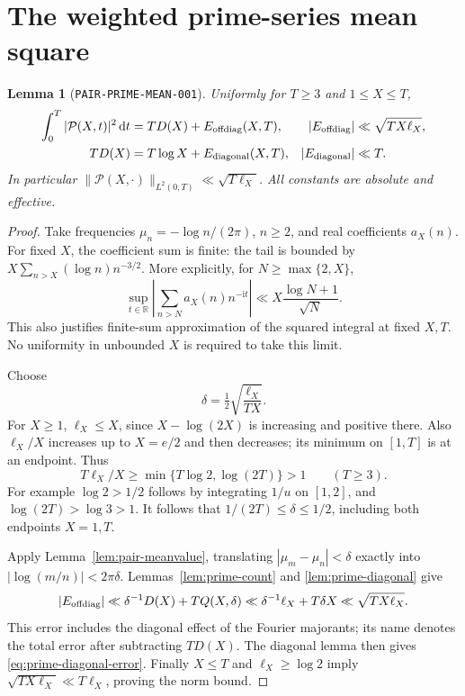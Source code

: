 \documentclass[11pt]{article}
\newtheorem{lemma}{Lemma}
\newcommand{\dd}{\,\mathrm d}
\newcommand{\ii}{\mathrm i}
\newcommand{\PS}{\mathcal P}
\begin{document}
\section{The weighted prime-series mean square}

\begin{lemma}[\texttt{PAIR-PRIME-MEAN-001}]\label{lem:prime-mean}
Uniformly for \(T\geq3\) and \(1\leq X\leq T\),
\begin{align}
 \int_0^T|\PS(X,t)|^2\dd t
 &=TD(X)+E_{\rm offdiag}(X,T),&
 |E_{\rm offdiag}|&\ll\sqrt{TX\ell_X},\label{eq:prime-mean}\\
 TD(X)&=T\log X+E_{\rm diagonal}(X,T),&
 |E_{\rm diagonal}|&\ll T.\label{eq:prime-diagonal-error}
\end{align}
In particular \(\|\PS(X,\cdot)\|_{L^2(0,T)}
\ll\sqrt{T\ell_X}\). All constants are absolute and effective.
\end{lemma}
\begin{proof}
Take frequencies \(\mu_n=-\log n/(2\pi)\), \(n\geq2\), and real
coefficients \(a_X(n)\). For fixed \(X\), the coefficient sum is
finite: the tail is bounded by \(X\sum_{n>X}(\log n)n^{-3/2}\).
More explicitly, for \(N\geq\max\{2,X\}\),
\[
 \sup_{t\in\mathbb R}\left|
       \sum_{n>N}a_X(n)n^{-\ii t}\right|
 \ll X\frac{\log N+1}{\sqrt N}.
\]
This also justifies finite-sum approximation of the squared integral
at fixed \(X,T\). No uniformity in unbounded \(X\) is required to
take this limit.

Choose
\begin{equation}\label{eq:prime-bandwidth}
 \delta=\tfrac12\sqrt{\frac{\ell_X}{TX}}.
\end{equation}
For \(X\geq1\), \(\ell_X\leq X\), since
\(X-\log(2X)\) is increasing and positive there.
Also \(\ell_X/X\) increases up to \(X=e/2\) and then decreases;
its minimum on \([1,T]\) is at an endpoint. Thus
\[
 T\ell_X/X\geq\min\{T\log2,\log(2T)\}>1\qquad(T\geq3).
\]
For example \(\log2>1/2\) follows by integrating \(1/u\) on
\([1,2]\), and \(\log(2T)>\log3>1\).
It follows that \(1/(2T)\leq\delta\leq1/2\), including both
endpoints \(X=1,T\).

Apply Lemma~\ref{lem:pair-meanvalue}, translating
\(|\mu_m-\mu_n|<\delta\) exactly into
\(|\log(m/n)|<2\pi\delta\). Lemmas~\ref{lem:prime-count}
and \ref{lem:prime-diagonal} give
\[
 |E_{\rm offdiag}|
 \ll\delta^{-1}D(X)+TQ(X,\delta)
 \ll\delta^{-1}\ell_X+T\delta X
 \ll\sqrt{TX\ell_X}.
\]
This error includes the diagonal effect of the Fourier majorants;
its name denotes the total error after subtracting \(TD(X)\).
The diagonal lemma then gives \eqref{eq:prime-diagonal-error}.
Finally \(X\leq T\) and \(\ell_X\geq\log2\) imply
\(\sqrt{TX\ell_X}\ll T\ell_X\), proving the norm bound.
\end{proof}
\end{document}
